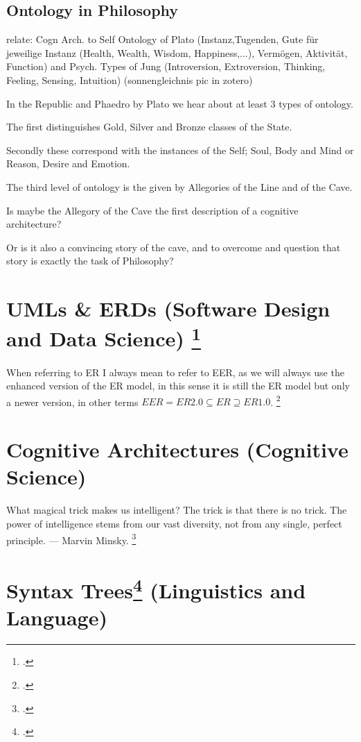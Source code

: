 \documentclass[12pt,a4paper]{article}
\begin{document}
\subsection{Ontology in Philosophy}

relate: Cogn Arch. to Self Ontology of Plato (Instanz,Tugenden, Gute für jeweilige Instanz (Health, Wealth, Wisdom, Happiness,...), Vermögen, Aktivität, Function) and Psych. Types of Jung (Introversion, Extroversion, Thinking, Feeling, Sensing, Intuition) (sonnengleichnis pic in zotero)

In the Republic and Phaedro by Plato we hear about at least 3 types of ontology. 

The first distinguishes Gold, Silver and Bronze classes of the State.

Secondly these correspond with the instances of the Self; Soul, Body and Mind or Reason, Desire and Emotion.

The third level of ontology is the given by Allegories of the Line and of the Cave.

Is maybe the Allegory of the Cave the first description of a cognitive architecture?

Or is it also a convincing story of the cave, and to overcome and question that story is exactly the task of Philosophy? 

\section{UMLs \& ERDs (Software Design and Data Science) \footcite{ElmasriNavathe2015}}

When referring to ER I always mean to refer to EER, as we will always use the enhanced version of the ER model, in this sense it is still the ER model but only a newer version, in other terms $EER = ER 2.0 \subseteq ER \supseteq ER 1.0 $. \footcite[107]{ElmasriNavathe2015}

\section{Cognitive Architectures (Cognitive Science)}
What magical trick makes us intelligent? The trick is that there is no trick. The power of intelligence stems from our vast diversity, not from any single, perfect principle. — Marvin Minsky. \footcite[308]{Minsky1988}

\section{Syntax Trees\footcite{Carnie2012} (Linguistics and Language)}
\end{document}
